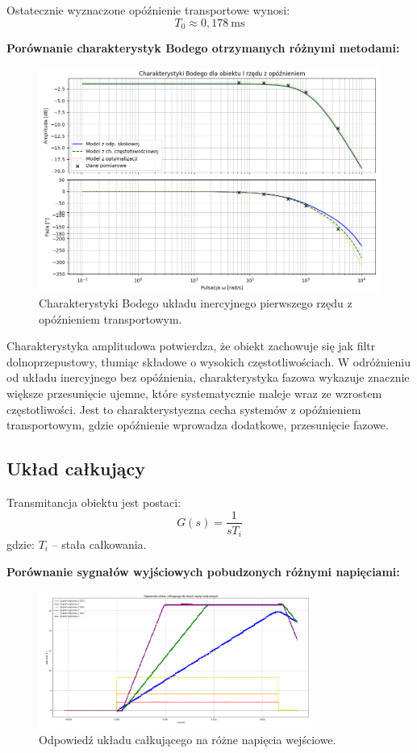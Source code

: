 \documentclass[12pt,a4paper]{article}
\begin{document}
	Ostatecznie wyznaczone opóźnienie transportowe wynosi:
	\[
	\boxed{T_0 \approx 0{,}178~\text{ms}}
	\]
	
	\textbf{Porównanie charakterystyk Bodego otrzymanych różnymi metodami:}
	\begin{figure}[H]
		\centering
		\includegraphics[width=1\linewidth]{zdjecia/1rzad_z_opz.png}
		\caption{Charakterystyki Bodego układu inercyjnego pierwszego rzędu z opóźnieniem transportowym.}
		\label{fig:Body1_z_opz}
	\end{figure}
	
	Charakterystyka amplitudowa potwierdza, że obiekt zachowuje się jak filtr dolnoprzepustowy, tłumiąc składowe o wysokich częstotliwościach. W odróżnieniu od układu inercyjnego bez opóźnienia, charakterystyka fazowa wykazuje znacznie większe przesunięcie ujemne, które systematycznie maleje wraz ze wzrostem częstotliwości. Jest to charakterystyczna cecha systemów z opóźnieniem transportowym, gdzie opóźnienie wprowadza dodatkowe, przesunięcie fazowe.
	
	\subsection{Układ całkujący}
	Transmitancja obiektu jest postaci:
	\begin{equation}
		G(s) = \frac{1}{sT_i}
	\end{equation}
	gdzie: \(T_i\) – stała całkowania.
	
	\textbf{Porównanie sygnałów wyjściowych pobudzonych różnymi napięciami:}
	\begin{figure}[H]
		\centering
		\includegraphics[width=0.8\textwidth]{zdjecia/UkladCalk.png}
		\caption{Odpowiedź układu całkującego na różne napięcia wejściowe.}
		\label{fig:uklad_calk}
	\end{figure}
	
\end{document}
